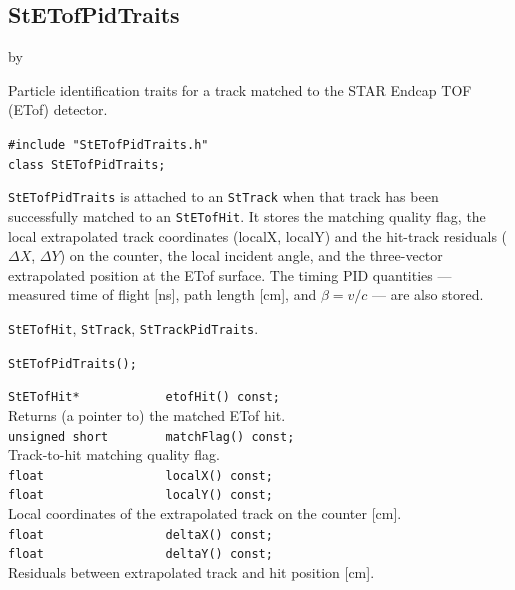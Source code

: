 \documentclass[twoside]{article}
\newcommand{\entrylabel}[1]{\mbox{\textbf{{#1}}}\hfil}%
\newenvironment{entry}
{\begin{list}{}%
    {\renewcommand{\makelabel}{\entrylabel}%
     \setlength{\labelwidth}{90pt}%
     \setlength{\leftmargin}{\labelwidth}
     \advance\leftmargin by \labelsep%
      }%
    }%
  {\end{list}}
\newcommand{\Entrylabel}[1]%
{\raisebox{0pt}[1ex][0pt]{\makebox[\labelwidth][l]%
    {\parbox[t]{\labelwidth}{\hspace{0pt}\textbf{{#1}}}}}}
\newenvironment{Entry}%
{\renewcommand{\entrylabel}{\Entrylabel}\begin{entry}}%
  {\end{entry}}
\begin{document}
\subsection{StETofPidTraits}
\label{sec:StETofPidTraits}
\begin{Entry}
\item[Summary] Particle identification traits for a track matched to the
    STAR Endcap TOF (ETof) detector.
\item[Synopsis]
    \verb+#include "StETofPidTraits.h"+\\
    \verb+class StETofPidTraits;+\\
\item[Description]
    \texttt{StETofPidTraits} is attached to an \texttt{StTrack} when that
    track has been successfully matched to an \texttt{StETofHit}.  It stores
    the matching quality flag, the local extrapolated track coordinates
    (localX, localY) and the hit-track residuals ($\Delta X$, $\Delta Y$) on
    the counter, the local incident angle, and the three-vector extrapolated
    position at the ETof surface.  The timing PID quantities --- measured time
    of flight [ns], path length [cm], and $\beta=v/c$ --- are also stored.
\item[Related Classes]
    \texttt{StETofHit}, \texttt{StTrack}, \texttt{StTrackPidTraits}.
\item[Public\\ Constructors]
    \verb+StETofPidTraits();+\\
\item[Public Member\\ Functions]
    \verb+StETofHit*            etofHit() const;+\\
    Returns (a pointer to) the matched ETof hit.\\
    \verb+unsigned short        matchFlag() const;+\\
    Track-to-hit matching quality flag.\\
    \verb+float                 localX() const;+\\
    \verb+float                 localY() const;+\\
    Local coordinates of the extrapolated track on the counter [cm].\\
    \verb+float                 deltaX() const;+\\
    \verb+float                 deltaY() const;+\\
    Residuals between extrapolated track and hit position [cm].\\

\end{Entry}
\end{document}
